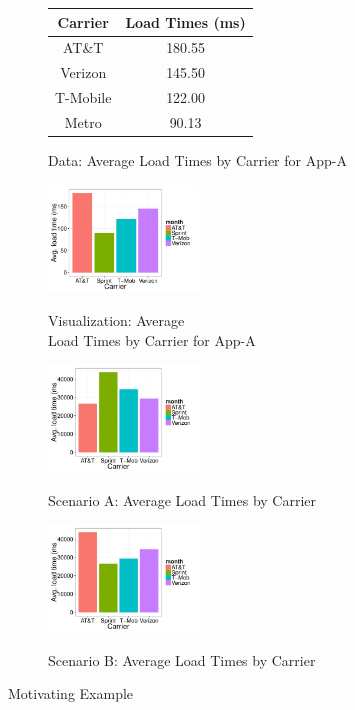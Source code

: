 \begin{figure}[h]
\vspace{-15pt}
	\centering
	\begin{subfigure}{0.49\linewidth}
	   \begin{tabular}{cc} \hline
		  Carrier & Load Times (ms) \\ \hline
		  AT\&T & 180.55 \\ \hline
		  Verizon &  145.50\\ \hline
		  T-Mobile & 122.00 \\ \hline
		  Metro & 90.13 \\ \hline
		  \end{tabular}
		  \caption{Data: Average Load Times by Carrier for App-A} \label{tab:staplerX}
	\end{subfigure}
	\begin{subfigure}{0.49\linewidth}
		\centering
		{\includegraphics[width=4cm] {Images/dist1.pdf}}
		\caption{Visualization: Average \\ Load Times by Carrier
		 for App-A}
		\label{fig:staplerX}
	\end{subfigure}
	
	\centering
	\begin{subfigure}{0.49\linewidth}
		{\includegraphics[width=4cm] {Images/dist2.pdf}}
		\caption{Scenario A: Average Load Times by Carrier}
		\label{fig:staplerX-a}
	\end{subfigure}
	\begin{subfigure}{0.49\linewidth}
		\centering
		{\includegraphics[width=4cm] {Images/dist3.pdf}}
		\caption{Scenario B: Average Load Times by Carrier}
		\label{fig:baseline_views}
	\end{subfigure}
	\vspace{-10pt}
	\caption{Motivating Example}
	\label{fig:staplerX-b}
	\vspace{-10pt}
\end{figure}

